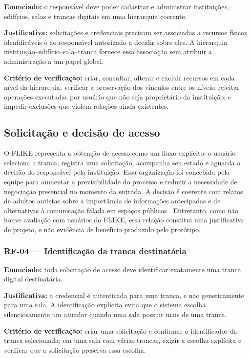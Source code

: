 \textbf{Enunciado:} o responsável deve poder cadastrar e administrar instituições, edifícios, salas e trancas digitais em uma hierarquia coerente.

\textbf{Justificativa:} solicitações e credenciais precisam ser associadas a recursos físicos identificáveis e ao responsável autorizado a decidir sobre eles. A hierarquia instituição--edifício--sala--tranca fornece essa associação sem atribuir a administração a um papel global.

\textbf{Critério de verificação:} criar, consultar, alterar e excluir recursos em cada nível da hierarquia; verificar a preservação dos vínculos entre os níveis; rejeitar operações executadas por usuário que não seja proprietário da instituição; e impedir exclusões que violem relações ainda existentes.

\subsection{Solicitação e decisão de acesso}

O FLIKE representa a obtenção de acesso como um fluxo explícito: o usuário seleciona a tranca, registra uma solicitação, acompanha seu estado e aguarda a decisão do responsável pela instituição. Essa organização foi concebida pela equipe para aumentar a previsibilidade do processo e reduzir a necessidade de negociação presencial no momento da entrada. A decisão é coerente com relatos de adultos autistas sobre a importância de informações antecipadas e de alternativas à comunicação falada em espaços públicos \cite{maclennan2023sensory}. Entretanto, como não houve avaliação com usuários do FLIKE, essa relação constitui uma justificativa de projeto, e não evidência de benefício produzido pelo protótipo.

\subsubsection*{RF-04 --- Identificação da tranca destinatária}

\textbf{Enunciado:} toda solicitação de acesso deve identificar exatamente uma tranca digital destinatária.

\textbf{Justificativa:} a credencial é autenticada para uma tranca, e não genericamente para uma sala. A identificação explícita evita que o sistema escolha silenciosamente um atuador quando uma sala possuir mais de uma tranca.

\textbf{Critério de verificação:} criar uma solicitação e confirmar o identificador da tranca selecionada; em uma sala com várias trancas, exigir a escolha explícita e verificar que a solicitação preserva essa escolha.

